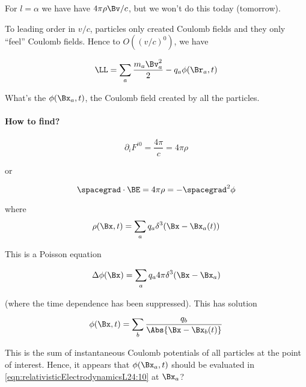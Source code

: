 For $l = \alpha$ we have have $4 \pi \rho \Bv/c$, but we won't do this today (tomorrow).

To leading order in $v/c$, particles only created Coulomb fields and they only ``feel'' Coulomb fields.  Hence to $O((v/c)^0)$, we have 

\begin{equation}\label{eqn:relativisticElectrodynamicsL24:150}
\LL = \sum_a \frac{m_a \Bv_a^2}{2} - q_a \phi(\Br_a, t)
\end{equation}

What's the $\phi(\Bx_a, t)$, the Coulomb field created by all the particles.

\paragraph{How to find?}

\begin{equation}\label{eqn:relativisticElectrodynamicsL24:170}
\partial_i F^{i 0} = \frac{4 \pi}{c} = 4 \pi \rho
\end{equation}

or

\begin{equation}\label{eqn:relativisticElectrodynamicsL24:190}
\spacegrad \cdot \BE = 4 \pi \rho = - \spacegrad^2 \phi 
\end{equation}

where
\begin{equation}\label{eqn:relativisticElectrodynamicsL24:210}
\rho(\Bx, t) = \sum_a q_a \delta^3 (\Bx - \Bx_a(t))
\end{equation}

This is a Poisson equation

\begin{equation}\label{eqn:relativisticElectrodynamicsL24:230}
\Delta \phi(\Bx) = \sum_a q_a 4 \pi \delta^3(\Bx - \Bx_a)
\end{equation}

(where the time dependence has been suppressed).  This has solution 

\begin{equation}\label{eqn:relativisticElectrodynamicsL24:10}
\phi(\Bx, t) = \sum_b \frac{q_b}{\Abs{\Bx - \Bx_b(t)}}
\end{equation}

This is the sum of instantaneous Coulomb potentials of all particles at the point of interest.  Hence, it appears that $\phi(\Bx_a, t)$ should be evaluated in \ref{eqn:relativisticElectrodynamicsL24:10} at $\Bx_a$?

